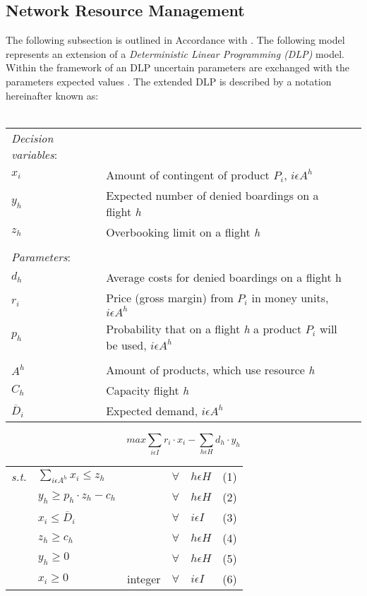 \subsection{Network Resource Management} \label{ssec3.4.2}

The following subsection is outlined in Accordance with \citet[pp.165-168][referring to \cite{karaesmen2004}]{klein2008}. The following model represents an extension of a \textit{Deterministic Linear Programming (DLP)} model. Within the framework of an DLP uncertain parameters are exchanged with the parameters expected values \cite[p.109]{klein2008}. The extended DLP is described by a notation hereinafter known as:
\\
\\
\begin{tabular}{lll}
	\textit{Decision variables}: &&\\
	 $x_{i}$	& Amount of contingent of product $P_{i}$, $i\epsilon A^{h}$     &\\
	 $y_{h}$    & Expected number of denied boardings on a flight \textit{h}&\\
     $z_{h}$	& Overbooking limit on a flight \textit{h} &\\	
     &&\\ 
	\textit{Parameters}: &&\\
	 $d_{h}$	& Average costs for denied boardings on a flight $\textit{h}$ &\\
	 $r_{i}$  & Price (gross margin) from $P_{i}$ in money units, $i\epsilon A^{h}$\\
	 $p_{h}$ & Probability that on a flight \textit{h} a product $P_{i}$ will be used, $i\epsilon A^{h}$ &\\		  
			  &&\\
	 $A^{h}$ & Amount of products, which use resource \textit{h}&\\
	 $C_{h}$ & Capacity flight \textit{h}&\\
	 $\overline{D}_{i}$ & Expected demand, $i\epsilon A^{h}$ &
\end{tabular}
\begin{equation} \label{eq:3.21}
max \sum_{i\epsilon I} r_{i}\cdot x_{i} - \sum_{h\epsilon H} d_{h}\cdot y_{h}
\end{equation}
\begin{center}
	\begin{tabular}{rlllll}
\textit{s.t.} 	& $\sum_{i\epsilon A^{h}} x_{i}\leq z_{h}$ &    & $\forall$  & $h  \epsilon H$ & (1)\\
		& $y_{h}\geq p_{h}\cdot z_{h}-c_{h}$            &    & $\forall$  & $h  \epsilon H$ & (2)\\
		& $x_{i}\leq \overline{D}_{i}$ &             & $\forall$ & $i  \epsilon I$ & (3)  \\
		& $z_{h}\geq c_{h}$ &             & $\forall$ & $h  \epsilon H$ & (4) \\
		& $y_{h}\geq 0$     &             & $\forall$ & $h  \epsilon H$ & (5) \\
		& $x_{i}\geq 0$     & integer     & $\forall$ & $i  \epsilon I$ & (6) 
	\end{tabular}
\end{center}
